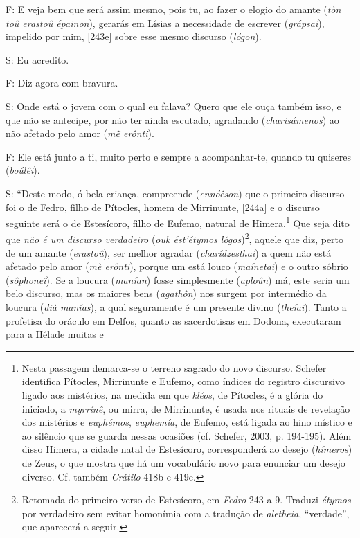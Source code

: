 F: E veja bem que será assim mesmo, pois tu, ao fazer o elogio do amante
(\emph{tòn toû erastoû épainon}), gerarás em Lísias a necessidade de
escrever (\emph{grápsai}), impelido por mim, {[}243e{]} sobre esse mesmo
discurso (\emph{lógon}).

S: Eu acredito.

F: Diz agora com bravura.

S: Onde está o jovem com o qual eu falava? Quero que ele ouça também
isso, e que não se antecipe, por não ter ainda escutado, agradando
(\emph{charisámenos}) ao não afetado pelo amor (\emph{mḕ erônti}).

F: Ele está junto a ti, muito perto e sempre a acompanhar-te, quando tu
quiseres (\emph{boúlêi}).

S: ``Deste modo, ó bela criança, compreende (\emph{ennóêson}) que o
primeiro discurso foi o de Fedro, filho de Pítocles, homem de
Mirrinunte, {[}244a{]} e o discurso seguinte será o de Estesícoro, filho
de Eufemo, natural de Himera.\footnote{Nesta passagem demarca-se o
  terreno sagrado do novo discurso. Schefer identifica Pítocles,
  Mirrinunte e Eufemo, como índices do registro discursivo ligado aos
  mistérios, na medida em que \emph{kléos}, de Pítocles, é a glória do
  iniciado, a \emph{myrrínê}, ou mirra, de Mirrinunte, é usada nos
  rituais de revelação dos mistérios e \emph{euphémos}, \emph{euphemía},
  de Eufemo, está ligada ao hino místico e ao silêncio que se guarda
  nessas ocasiões (cf. Schefer, 2003, p. 194-195). Além disso Himera, a
  cidade natal de Estesícoro, corresponderá ao desejo (\emph{hímeros})
  de Zeus, o que mostra que há um vocabulário novo para enunciar um
  desejo diverso. Cf. também \emph{Crátilo} 418b e 419e.} Que seja dito
que \emph{não é um discurso verdadeiro} (\emph{ouk ést'étymos
lógos})\footnote{Retomada do primeiro verso de Estesícoro, em
  \emph{Fedro} 243 a-9. Traduzi \emph{étymos} por verdadeiro sem evitar
  homonímia com a tradução de \emph{aletheia}, ``verdade'', que
  aparecerá a seguir.}, aquele que diz, perto de um amante
(\emph{erastoû}), ser melhor agradar (\emph{charídzesthai}) a quem não
está afetado pelo amor (\emph{mḕ erônti}), porque um está louco
(\emph{maínetai}) e o outro sóbrio (\emph{sôphoneî}). Se a loucura
(\emph{manían}) fosse simplesmente (\emph{aploûn}) má, este seria um
belo discurso, mas os maiores bens (\emph{agathôn}) nos surgem por
intermédio da loucura (\emph{dià manías}), a qual seguramente é um
presente divino (\emph{theíai}). Tanto a profetisa do oráculo em Delfos,
quanto as sacerdotisas em Dodona, executaram para a Hélade muitas e
